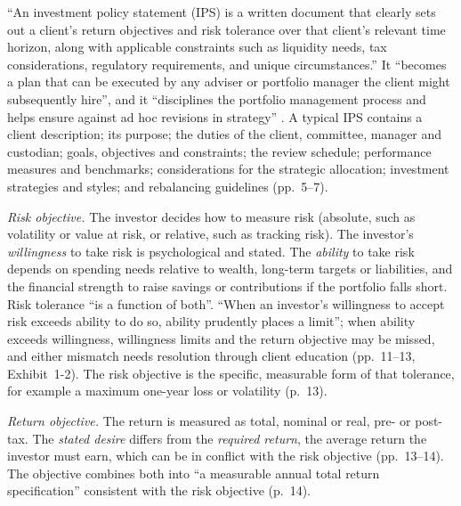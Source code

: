 \begin{qfmethod}\label{meth:investment-policy-statement}
 ``An investment policy statement (IPS) is a written document that clearly sets out a client's return objectives and risk tolerance over that client's relevant time horizon, along with applicable constraints such as liquidity needs, tax considerations, regulatory requirements, and unique circumstances.'' It ``becomes a plan that can be executed by any adviser or portfolio manager the client might subsequently hire'', and it ``disciplines the portfolio management process and helps ensure against ad hoc revisions in strategy'' \citep[chap.~1, p.~2]{managing-investment-portfolios-2007}. A typical IPS contains a client description; its purpose; the duties of the client, committee, manager and custodian; goals, objectives and constraints; the review schedule; performance measures and benchmarks; considerations for the strategic allocation; investment strategies and styles; and rebalancing guidelines (pp.~5--7).

\emph{Risk objective.} The investor decides how to measure risk (absolute, such as volatility or value at risk, or relative, such as tracking risk). The investor's \emph{willingness} to take risk is psychological and stated. The \emph{ability} to take risk depends on spending needs relative to wealth, long-term targets or liabilities, and the financial strength to raise savings or contributions if the portfolio falls short. Risk tolerance ``is a function of both''. ``When an investor's willingness to accept risk exceeds ability to do so, ability prudently places a limit''; when ability exceeds willingness, willingness limits and the return objective may be missed, and either mismatch needs resolution through client education (pp.~11--13, Exhibit~1-2). The risk objective is the specific, measurable form of that tolerance, for example a maximum one-year loss or volatility (p.~13).

\emph{Return objective.} The return is measured as total, nominal or real, pre- or post-tax. The \emph{stated desire} differs from the \emph{required return}, the average return the investor must earn, which can be in conflict with the risk objective (pp.~13--14). The objective combines both into ``a measurable annual total return specification'' consistent with the risk objective (p.~14).


\end{qfmethod}
